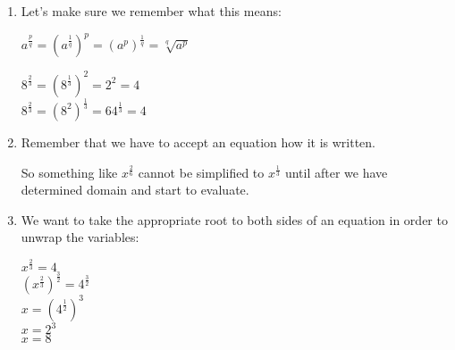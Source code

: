 \documentclass[letterpaper,12pt,fleqn]{article}
\begin{document}
\begin{enumerate}
  \item Let's make sure we remember what this means:

    $a^{\frac{p}{q}}=(a^{\frac{1}{q}})^p=(a^p)^{\frac{1}{q}}=\sqrt[q]{a^p}$

    $8^{\frac{2}{3}}=(8^{\frac{1}{3}})^2=2^2=4$ \\
    $8^{\frac{2}{3}}=(8^2)^{\frac{1}{3}}=64^{\frac{1}{3}}=4$

  \item Remember that we have to accept an equation how it is written.

    So something like $x^{\frac{2}{6}}$ cannot be simplified to $x^{\frac{1}{3}}$
    until after we have determined domain and start to evaluate.

  \item We want to take the appropriate root to both sides of an equation in
    order to unwrap the variables:

    $x^{\frac{2}{3}}=4$ \\
    $(x^{\frac{2}{3}})^{\frac{3}{2}}=4^{\frac{3}{2}}$ \\
    $x=(4^{\frac{1}{2}})^3$ \\
    $x=2^3$ \\
    $x=8$
\end{enumerate}
\end{document}
